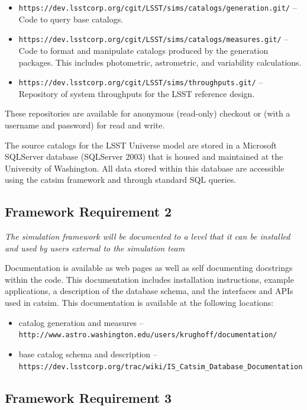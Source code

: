 \documentclass[]{article}
\begin{document}
{\begin{itemize}
\item {\tt https://dev.lsstcorp.org/cgit/LSST/sims/catalogs/generation.git/} -- Code to query
base catalogs.
\item {\tt https://dev.lsstcorp.org/cgit/LSST/sims/catalogs/measures.git/} -- Code to format
and manipulate catalogs produced by the generation packages.  This includes photometric, 
astrometric, and variability calculations.
\item {\tt https://dev.lsstcorp.org/cgit/LSST/sims/throughputs.git/} -- Repository
of system throughputs for the LSST reference design.
\end{itemize}

These repositories are available for anonymous (read-only) checkout or
(with a username and password) for read and write.

The source catalogs for the LSST Universe model are stored in a
Microsoft SQLServer database (SQLServer 2003) that is housed and
maintained at the University of Washington. All data stored within
this database are accessible using the catsim framework and through
standard SQL queries.

\subsection{Framework Requirement 2}

{\it The simulation framework will be documented to a level
  that it can be installed and used by users external to the
  simulation team}

Documentation is available as web pages as well as self documenting
docstrings within the code.  This documentation includes installation
instructions, example applications, a description of the database
schema, and the interfaces and APIs used in catsim. This documentation
is available at the following locations:
\begin{itemize}
\item catalog generation and measures -- {\tt http://www.astro.washington.edu/users/krughoff/documentation/}
\item base catalog schema and description -- {\tt https://dev.lsstcorp.org/trac/wiki/IS\_Catsim\_Database\_Documentation}
\end{itemize}


\subsection{Framework Requirement 3}

}
\end{document}
